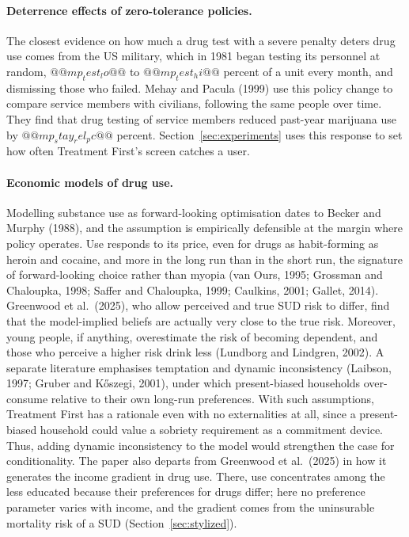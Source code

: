 \documentclass[10pt]{article}
\begin{document}
\paragraph{Deterrence effects of zero-tolerance policies.} The closest evidence on how much a drug test with a severe penalty deters drug use comes from the US military, which in 1981 began testing its personnel at random, $@@mp_test_lo@@$ to $@@mp_test_hi@@$ percent of a unit every month, and dismissing those who failed. Mehay and Pacula (1999) use this policy change to compare service members with civilians, following the same people over time.    They find that drug testing of service members reduced past-year marijuana use by $@@mp_stay_rel_pc@@$ percent.  Section~\ref{sec:experiments} uses this response to set how often Treatment First's screen catches a user.

\paragraph{Economic models of drug use.} Modelling substance use as forward-looking
optimisation dates to Becker and Murphy (1988), and the assumption is empirically
defensible at the margin where policy operates. Use responds to its price, even for drugs as habit-forming as heroin and cocaine, and more in the long run than in the short run, the signature of forward-looking choice rather than myopia (van Ours, 1995; Grossman and Chaloupka, 1998; Saffer and Chaloupka, 1999; Caulkins, 2001; Gallet, 2014). Greenwood et al.\ (2025), who allow perceived and true SUD risk to differ, find that the model-implied beliefs are actually very close to the true risk. Moreover, young people, if anything, overestimate the risk of becoming dependent, and those who perceive a higher risk drink less (Lundborg and Lindgren, 2002). A separate literature emphasises temptation and dynamic
inconsistency (Laibson, 1997; Gruber and K\H{o}szegi, 2001), under which
present-biased households over-consume relative to their own long-run preferences. With such assumptions, Treatment First has a rationale even with no externalities at all, since a present-biased household could value a sobriety requirement as a commitment device.   Thus, adding dynamic inconsistency to the model would strengthen the case for conditionality. The paper also departs from Greenwood et al.\ (2025) in how it generates the income gradient in drug use. There, use concentrates among the less educated because their preferences for drugs differ; here no preference parameter varies with income, and the gradient comes from the uninsurable mortality risk of a SUD (Section~\ref{sec:stylized}).
\end{document}
